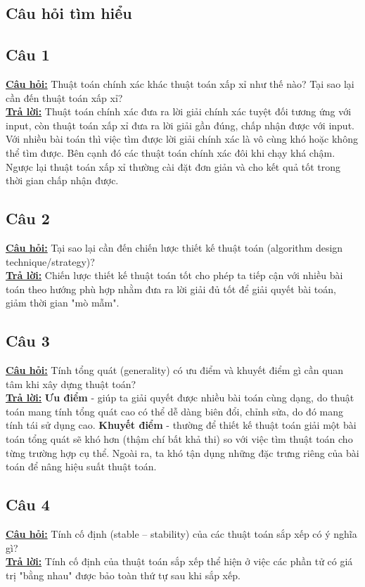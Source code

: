 \documentclass[14pt]{extarticle}
\begin{document}
	
	\pagebreak
\begin{flushleft}
	\section{Câu hỏi tìm hiểu}
	\subsection{Câu 1}
		\underline{\textbf{Câu hỏi:}} Thuật toán chính xác khác thuật toán xấp xỉ như thế nào? Tại sao lại cần đến thuật toán xấp xỉ?\\
		\underline{\textbf{Trả lời:}} Thuật toán chính xác đưa ra lời giải chính xác tuyệt đối tương ứng với input, còn thuật toán xấp xỉ đưa ra lời giải gần đúng, chấp nhận được với input. Với nhiều bài toán thì việc tìm được lời giải chính xác là vô cùng khó hoặc không thể tìm được. Bên cạnh đó các thuật toán chính xác đôi khi chạy khá chậm. Ngược lại thuật toán xấp xỉ thường cài đặt đơn giản và cho kết quả tốt trong thời gian chấp nhận được. \\
	\subsection{Câu 2}
		\underline{\textbf{Câu hỏi:}} Tại sao lại cần đến chiến lược thiết kế thuật toán (algorithm design technique/strategy)?\\
		\underline{\textbf{Trả lời:}} Chiến lược thiết kế thuật toán tốt cho phép ta tiếp cận với nhiều bài toán theo hướng phù hợp nhằm đưa ra lời giải đủ tốt để giải quyết bài toán, giảm thời gian "mò mẫm". \\
	\subsection{Câu 3}
		\underline{\textbf{Câu hỏi:}} Tính tổng quát (generality) có ưu điểm và khuyết điểm gì cần quan tâm khi xây dựng thuật toán?\\
		\underline{\textbf{Trả lời:}} \textbf{Ưu điểm} - giúp ta giải quyết được nhiều bài toán cùng dạng, do thuật toán mang tính tổng quát cao có thể dễ dàng biên đổi, chỉnh sửa, do đó mang tính tái sử dụng cao. \textbf{Khuyết điểm} - thường để thiết kế thuật toán giải một bài toán tổng quát sẽ khó hơn (thậm chí bất khả thi) so với việc tìm thuật toán cho từng trường hợp cụ thể. Ngoài ra, ta khó tận dụng những đặc trưng riêng của bài toán để nâng hiệu suất thuật toán.  
	\subsection{Câu 4}
		\underline{\textbf{Câu hỏi:}} Tính cố định (stable – stability) của các thuật toán sắp xếp có ý nghĩa gì?\\
		\underline{\textbf{Trả lời:}} Tính cố định của thuật toán sắp xếp thể hiện ở việc các phần tử có giá trị "bằng nhau" được bảo toàn thứ tự sau khi sắp xếp.\\

\end{flushleft}
\end{document}
